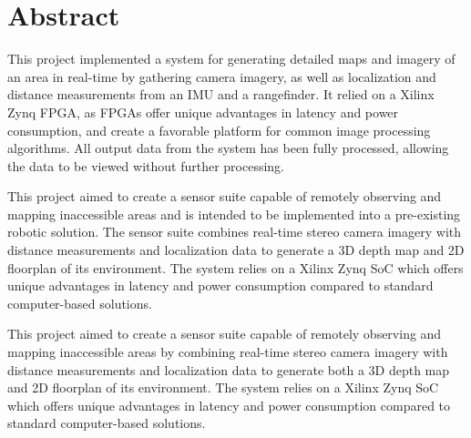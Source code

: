 {}
\section*{Abstract}
This project implemented a system for generating detailed maps and imagery of an area in real-time by gathering camera imagery, as well as localization and distance measurements from an IMU and a rangefinder. It relied on a Xilinx Zynq FPGA, as FPGAs offer unique advantages in latency and power consumption, and create a favorable platform for common image processing algorithms. All output data from the system has been fully processed, allowing the data to be viewed without further processing.
\par\null\par
This project aimed to create a sensor suite capable of remotely observing and mapping inaccessible areas and is intended to be implemented into a pre-existing robotic solution. The sensor suite combines real-time stereo camera imagery with distance measurements and localization data to generate a 3D depth map and 2D floorplan of its environment. The system relies on a Xilinx Zynq SoC which offers unique advantages in latency and power consumption compared to standard computer-based solutions.
\par\null\par
This project aimed to create a sensor suite capable of remotely observing and mapping inaccessible areas by combining real-time stereo camera imagery with distance measurements and localization data to generate both a 3D depth map and 2D floorplan of its environment. The system relies on a Xilinx Zynq SoC which offers unique advantages in latency and power consumption compared to standard computer-based solutions.